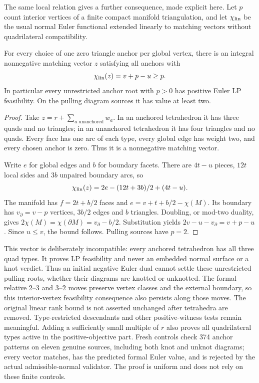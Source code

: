 The same local relation gives a further consequence, made explicit here.
Let $p$ count interior vertices of a finite compact manifold triangulation,
and let $\chi_{\rm lin}$ be the usual normal Euler functional extended
linearly to matching vectors without quadrilateral compatibility.

\begin{proposition}
For every choice of one zero triangle anchor per global vertex, there is
an integral nonnegative matching vector $z$ satisfying all anchors with
\[
 \chi_{\rm lin}(z)=v+p-u\ge p.
\]
In particular every unrestricted anchor root with $p>0$ has positive Euler
LP feasibility. On the pulling diagram sources it has value at least two.
\end{proposition}
\begin{proof}
Take $z=r+\sum_{a\text{ unanchored}}w_a$. In an anchored tetrahedron it
has three quads and no triangles; in an unanchored tetrahedron it has four
triangles and no quads. Every face has one arc of each type, every global
edge has weight two, and every chosen anchor is zero. Thus it is a
nonnegative matching vector.

Write $e$ for global edges and $b$ for boundary facets. There are $4t-u$
pieces, $12t$ local sides and $3b$ unpaired boundary arcs, so
\[
 \chi_{\rm lin}(z)=2e-(12t+3b)/2+(4t-u).
\]
The manifold has $f=2t+b/2$ faces and
$e=v+t+b/2-\chi(M)$. Its boundary has $v_\partial=v-p$ vertices,
$3b/2$ edges and $b$ triangles. Doubling, or mod-two duality, gives
$2\chi(M)=\chi(\partial M)=v_\partial-b/2$.
Substitution yields $2v-u-v_\partial=v+p-u$. Since $u\le v$, the bound
follows. Pulling sources have $p=2$.
\end{proof}

This vector is deliberately incompatible: every anchored tetrahedron has
all three quad types. It proves LP feasibility and never an embedded normal
surface or a knot verdict. Thus an initial negative Euler dual cannot settle
these unrestricted pulling roots, whether their diagrams are knotted or
unknotted. The formal relative $2$--$3$ and $3$--$2$ moves preserve vertex classes
and the external boundary, so this interior-vertex feasibility consequence
also persists along those moves. The original linear rank bound is not
asserted unchanged after tetrahedra are removed. Type-restricted descendants
and other positive-witness tests remain meaningful. Adding a sufficiently
small multiple of $r$ also proves all
quadrilateral types active in the positive-objective part. Fresh controls
check 374 anchor patterns on eleven genuine sources, including both knot
and unknot diagrams; every vector matches, has the predicted formal Euler
value, and is rejected by the actual admissible-normal validator. The proof
is uniform and does not rely on these finite controls.

